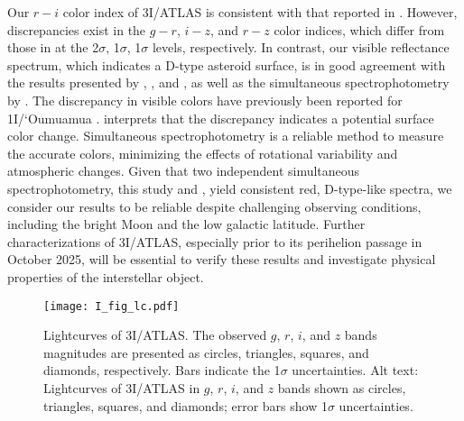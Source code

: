 \documentclass[]{pasj02}
\newcommand\I{3I/ATLAS\xspace}
\begin{document}
Our $r-i$ color index of \I is consistent with that reported in \cite{Bolin2025_3I}.
However, discrepancies exist in the $g-r$, $i-z$, and $r-z$ color indices, which differ from those in \citet{Bolin2025_3I} 
at the 2$\sigma$, 1$\sigma$, 1$\sigma$ levels, respectively.
In contrast, our visible reflectance spectrum, which indicates a D-type asteroid surface, is in good agreement with the results presented by \citet{Seligman2025_3I}, \citet{Opitom2025_3I}, and \citet{Marcos2025_3I},
as well as the simultaneous spectrophotometry by \citet{Seligman2025_3I}.
The discrepancy in visible colors have previously been reported for 1I/`Oumuamua \citep{Meech2017, Jewitt2017, Bannister2017}.
\citet{Bannister2017} interprets that the discrepancy indicates a potential surface color change.
Simultaneous spectrophotometry is a reliable method to measure the accurate colors, minimizing the effects of rotational variability and atmospheric changes.
Given that two independent simultaneous spectrophotometry, this study and \citet{Seligman2025_3I}, yield consistent red, D-type-like spectra, 
we consider our results to be reliable despite challenging observing conditions, including the bright Moon and the low galactic latitude.
Further characterizations of 3I/ATLAS, especially prior to its perihelion passage in October 2025, will be essential to verify these results and investigate physical properties of the interstellar object.

\begin{figure}
 \begin{center}
  \texttt{[image: I\_fig\_lc.pdf]} 
 \end{center}
\caption{
    Lightcurves of \I.
    The observed $g$, $r$, $i$, and $z$ bands magnitudes 
    are presented as circles, triangles, squares, and diamonds, respectively.
    Bars indicate the 1$\sigma$ uncertainties.
    {Alt text: Lightcurves of 3I/ATLAS in $g$, $r$, $i$, and $z$ bands shown as circles, triangles, squares, and diamonds; error bars show 1$\sigma$ uncertainties.} 
}\label{fig:lc}
\end{figure}
\end{document}
